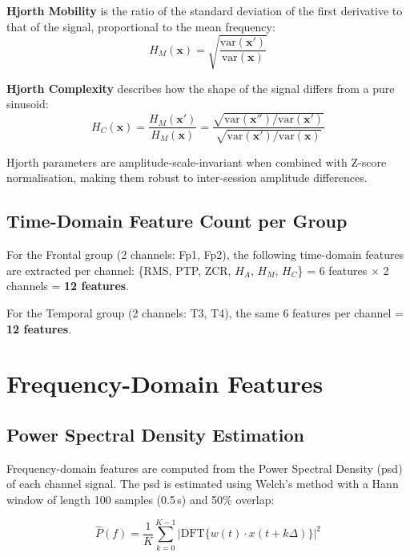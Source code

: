 \textbf{Hjorth Mobility} is the ratio of the standard
deviation of the first derivative to that of the signal,
proportional to the mean frequency:
\begin{equation}
H_M(\mathbf{x}) = \sqrt{\frac{\text{var}(\mathbf{x}')}
{\text{var}(\mathbf{x})}}
\label{eq:hjorth_mobility}
\end{equation}

\textbf{Hjorth Complexity} describes how the shape of the
signal differs from a pure sinusoid:
\begin{equation}
H_C(\mathbf{x}) = \frac{H_M(\mathbf{x}')}
{H_M(\mathbf{x})}
= \frac{\sqrt{\text{var}(\mathbf{x}'')/
\text{var}(\mathbf{x}')}}
{\sqrt{\text{var}(\mathbf{x}')/\text{var}(\mathbf{x})}}
\label{eq:hjorth_complexity}
\end{equation}

Hjorth parameters are amplitude-scale-invariant when combined
with Z-score normalisation, making them robust to inter-session
amplitude differences.

\subsection{Time-Domain Feature Count per Group}

For the Frontal group (2 channels: Fp1, Fp2), the following
time-domain features are extracted per channel:
\{RMS, PTP, ZCR, $H_A$, $H_M$, $H_C$\} = 6 features
$\times$ 2 channels = \textbf{12 features}.

For the Temporal group (2 channels: T3, T4), the same
6 features per channel = \textbf{12 features}.

\section{Frequency-Domain Features}
\label{sec:fe_freq}

\subsection{Power Spectral Density Estimation}

Frequency-domain features are computed from the Power
Spectral Density (\acrshort{psd}) of each channel signal.
The \acrshort{psd} is estimated using Welch's method with
a Hann window of length 100 samples (0.5\,s) and 50\%
overlap:

\begin{equation}
\hat{P}(f) = \frac{1}{K} \sum_{k=0}^{K-1}
\left|\text{DFT}\{w(t) \cdot x(t + k\Delta)\}\right|^2
\label{eq:welch}
\end{equation}

